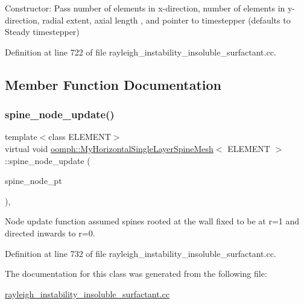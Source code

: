 Constructor\+: Pass number of elements in x-\/direction, number of elements in y-\/direction, radial extent, axial length , and pointer to timestepper (defaults to Steady timestepper) 



Definition at line 722 of file rayleigh\+\_\+instability\+\_\+insoluble\+\_\+surfactant.\+cc.



\subsection{Member Function Documentation}
\mbox{\label{classoomph_1_1MyHorizontalSingleLayerSpineMesh_ad007f1c20530cda9a495d89a4470772c}} 
\subsubsection{\texorpdfstring{spine\+\_\+node\+\_\+update()}{spine\_node\_update()}}
{\footnotesize\ttfamily template$<$class E\+L\+E\+M\+E\+NT$>$ \\
virtual void \hyperlink{classoomph_1_1MyHorizontalSingleLayerSpineMesh}{oomph\+::\+My\+Horizontal\+Single\+Layer\+Spine\+Mesh}$<$ E\+L\+E\+M\+E\+NT $>$\+::spine\+\_\+node\+\_\+update (\begin{DoxyParamCaption}\item[{Spine\+Node $\ast$}]{spine\+\_\+node\+\_\+pt }\end{DoxyParamCaption})\hspace{0.3cm}{\ttfamily [inline]}, {\ttfamily [virtual]}}



Node update function assumed spines rooted at the wall fixed to be at r=1 and directed inwards to r=0. 



Definition at line 732 of file rayleigh\+\_\+instability\+\_\+insoluble\+\_\+surfactant.\+cc.



The documentation for this class was generated from the following file\+:\begin{DoxyCompactItemize}
\item 
\hyperlink{rayleigh__instability__insoluble__surfactant_8cc}{rayleigh\+\_\+instability\+\_\+insoluble\+\_\+surfactant.\+cc}\end{DoxyCompactItemize}
